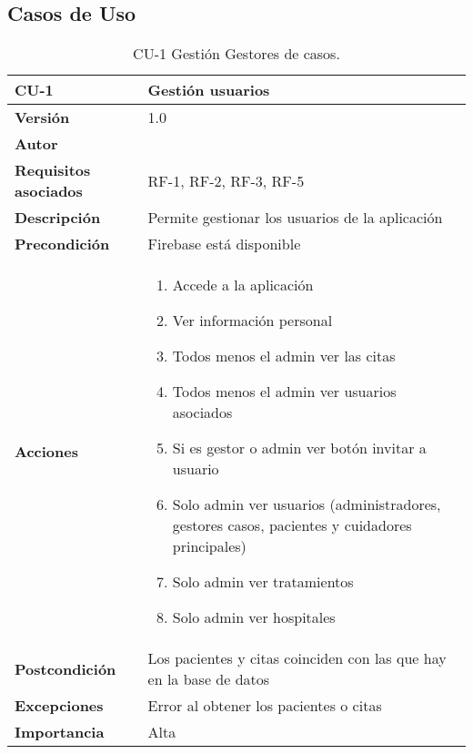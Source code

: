 \subsection{Casos de Uso}
\begin{table}[p]
	\centering
	\begin{tabularx}{\linewidth}{ p{} p{} }
		\toprule
		\textbf{CU-1}    & \textbf{Gestión usuarios}\\
		\toprule
		\textbf{Versión}              & 1.0    \\
		\textbf{Autor}                & {\nombre}\\
		\textbf{Requisitos asociados} & RF-1, RF-2, RF-3, RF-5\\
		\textbf{Descripción}          & Permite gestionar los usuarios de la aplicación\\
		\textbf{Precondición}         & Firebase está disponible \\
		\textbf{Acciones}             &
		\begin{enumerate}
			\def\labelenumi{\arabic{enumi}.}
			\tightlist
			\item Accede a la aplicación
			\item Ver información personal
			\item Todos menos el admin ver las citas
			\item Todos menos el admin ver usuarios asociados
			\item Si es gestor o admin ver botón invitar a usuario
			\item Solo admin ver usuarios (administradores, gestores casos, pacientes y cuidadores principales)
			\item Solo admin ver tratamientos
			\item Solo admin ver hospitales
		\end{enumerate}\\
		\textbf{Postcondición}        & Los pacientes y citas coinciden con las que hay en la base de datos \\
		\textbf{Excepciones}          & Error al obtener los pacientes o citas \\
		\textbf{Importancia}          & Alta \\
		\bottomrule
	\end{tabularx}
	\caption{CU-1 Gestión Gestores de casos.}
\end{table}

